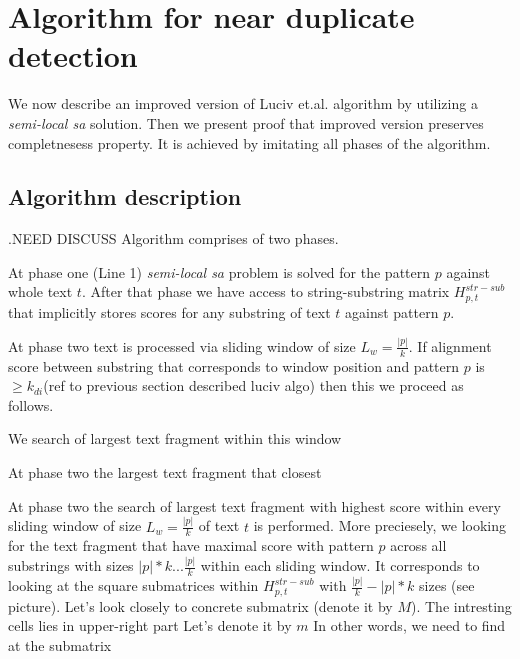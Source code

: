 \section{Algorithm for near duplicate detection}
\label{section:luciv}

We now describe an improved version of Luciv et.al. algorithm \cite{luciv2019interactive} by utilizing a \emph{semi-local sa} solution.
Then we present proof that improved version preserves completnesess property.
It is achieved by imitating all phases of the algorithm. 
 

\subsection{Algorithm description}

.NEED DISCUSS
Algorithm comprises of two phases.

At phase one (Line 1) \emph{semi-local sa} problem is solved for the pattern $p$ against whole text $t$.
After that phase we have access to string-substring matrix $H^{str-sub}_{p,t}$ that implicitly stores scores for any substring of text $t$ against pattern $p$.

At phase two  text is processed via sliding window of size $L_{w} =\frac{|p|}{k}$.
If alignment score between substring that corresponds to window position
and pattern $p$ is $\geq k_{di} $(ref to previous section described luciv algo) then this we proceed as follows.

We search of largest text fragment within  this window


At phase two the largest text fragment that closest 


At phase two the search of largest text fragment with highest score  within every sliding  window of size $L_{w} =\frac{|p|}{k}$ of text $t$ is performed.
More preciesely, we looking for the text fragment that have maximal score with pattern $p$ across all substrings with sizes $|p|*k...\frac{|p|}{k}$ within each sliding window.
It corresponds to looking at the square submatrices within $H^{str-sub}_{p,t}$  with $\frac{|p|}{k}-|p|*k$ sizes (see picture).
Let's look closely  to concrete submatrix (denote it by $M$).
The intresting cells lies in upper-right part
Let's denote it by $m$
In other words, we need to find at the submatrix  






